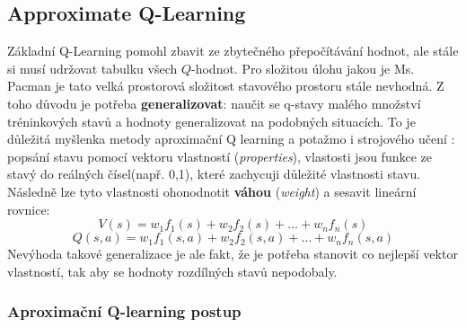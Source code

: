 \subsection{Approximate Q-Learning}
Základní Q-Learning pomohl zbavit ze zbytečného přepočítávání hodnot, ale stále si musí udržovat tabulku všech $Q$-hodnot. Pro složitou úlohu jakou je Ms. Pacman je tato velká prostorová složitost stavového prostoru stále nevhodná. Z toho důvodu je potřeba \textbf{generalizovat}: naučit se q-stavy malého množství tréninkových stavů a hodnoty generalizovat na podobných situacích. To je důležitá myšlenka metody aproximační Q learning a potažmo i strojového učení \cite{RLAprox}:
\newline
popsání stavu pomocí vektoru vlastností (\textit{properties}), vlastosti jsou funkce ze stavý do reálných čísel(např. 0,1), které zachycuji důležité vlastnosti stavu. Následně lze tyto vlastnosti ohonodnotit \textbf{váhou} (\textit{weight}) a sesavit lineární rovnice:
\begin{displaymath}
V(s) = w_1f_1(s) + w_2f_2(s) + \dots + w_nf_n(s)
\end{displaymath}
\begin{displaymath}
Q(s,a) = w_1f_1(s,a) + w_2f_2(s,a) + \dots + w_nf_n(s,a)
\end{displaymath}
Nevýhoda takové generalizace je ale fakt, že je potřeba stanovit co nejlepší vektor vlastností, tak aby se hodnoty rozdílných stavů nepodobaly.
\subsubsection{Aproximační Q-learning postup}

